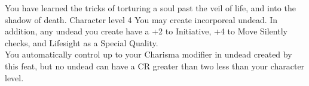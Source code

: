 \shortdescfeat
{You have learned the tricks of torturing a soul past the veil of life, and into the shadow of death.}
{Character level 4}
{You may create incorporeal undead. In addition, any undead you create have a +2 to Initiative, +4 to Move Silently checks, and Lifesight as a Special Quality.\\
You automatically control up to your Charisma modifier in undead created by this feat, but no undead can have a CR greater than two less than your character level.}

